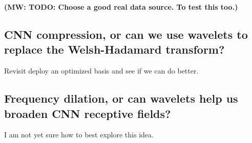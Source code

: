 \documentclass{article}
\newcommand{\MW}[1]{{\color{blue} {\bf (MW: #1)}}}
\begin{document}
\MW{TODO: Choose a good real data source. To test this too.}

\subsection{CNN compression, or can we use wavelets to replace the Welsh-Hadamard transform?}
Revisit \cite{yang2015deep} deploy an optimized basis and see if we can do better.


\subsection{Frequency dilation, or can wavelets help us broaden CNN receptive fields?}
I am not yet sure how to best explore this idea.

{\small


}
\end{document}
